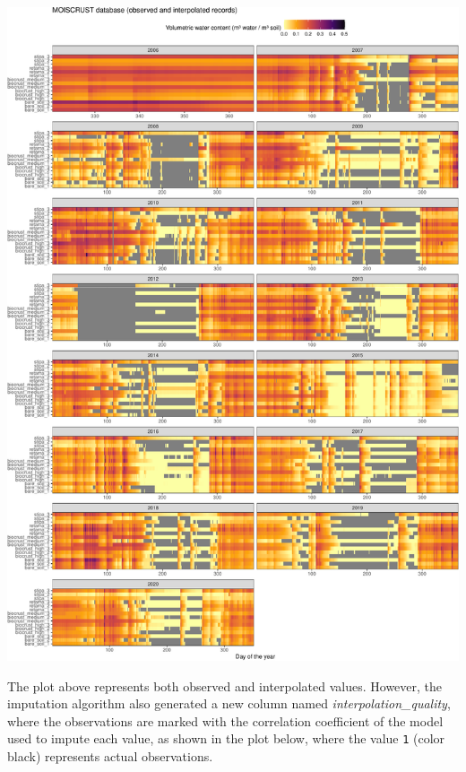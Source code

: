 \documentclass[
  table]{article}
\begin{document}
\includegraphics{moiscrust_files/figure-latex/unnamed-chunk-30-1.pdf}

The plot above represents both observed and interpolated values.
However, the imputation algorithm also generated a new column named
\emph{interpolation\_quality}, where the observations are marked with
the correlation coefficient of the model used to impute each value, as
shown in the plot below, where the value \texttt{1} (color black)
represents actual observations.
\end{document}
